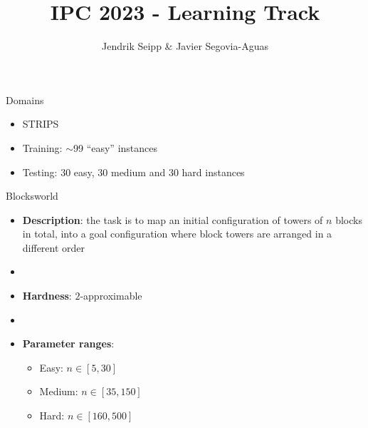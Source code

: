 \documentclass[aspectratio=169,xcolor=dvipsnames]{beamer}
\title[short title]{IPC 2023 - Learning Track} %
\author[Allauthors] {Jendrik Seipp \& Javier Segovia-Aguas}
\date{} %
\begin{document}
\begin{frame}
    \titlepage

\end{frame}

\begin{frame}{Domains}
    \begin{itemize}
        \item STRIPS
        \item Training: $\sim$99 ``easy'' instances
        \item Testing: 30 easy, 30 medium and 30 hard instances
    \end{itemize}
\end{frame}

\begin{frame}{Blocksworld}

    \begin{itemize}
        \item \textbf{Description}: the task is to map an initial configuration of towers of $n$ blocks in total, into a goal configuration where block towers are arranged in a different order
        \item[]
        \item \textbf{Hardness}: $2$-approximable
        \item[]
        \item \textbf{Parameter ranges}:
        \begin{itemize}
            \item Easy: $n \in [5, 30]$
            \item Medium: $n \in [35, 150]$
            \item Hard: $n \in [160, 500]$
        \end{itemize}
    \end{itemize}

\end{frame}
\end{document}
